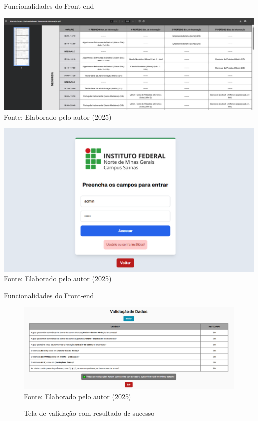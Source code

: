 \begin{frame}{Funcionalidades do Front-end}
    \begin{minipage}{0.48\textwidth}
        \centering
        \includegraphics[width=1\textwidth]{figuras/front-20.png}
        \footnotesize Fonte: Elaborado pelo autor (2025)
    \end{minipage}
    \hfill
    \begin{minipage}{0.48\textwidth}
        \centering
        \includegraphics[width=1\textwidth]{figuras/front-21.png}
        \footnotesize Fonte: Elaborado pelo autor (2025)
    \end{minipage}
\end{frame}

\begin{frame}{Funcionalidades do Front-end}
    \begin{figure}
        \centering
        \vspace{-0.5cm}
        \caption{Tela de validação com resultado de sucesso}
        \vspace{-0.2cm}
        \includegraphics[width=1\textwidth]{figuras/front-22.png}
        \\ %
        \footnotesize Fonte: Elaborado pelo autor (2025)
    \end{figure}
\end{frame}

